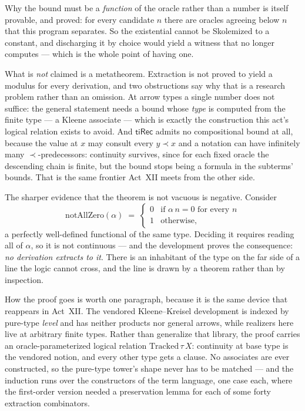 Why the bound must be a \emph{function} of the oracle rather than a number is
itself provable, and proved: for every candidate $n$ there are oracles
agreeing below $n$ that this program separates. So the existential cannot be
Skolemized to a constant, and discharging it by choice would yield a witness
that no longer computes --- which is the whole point of having one.

What is \emph{not} claimed is a metatheorem. Extraction is not proved to
yield a modulus for every derivation, and two obstructions say why that is a
research problem rather than an omission. At arrow types a single number does
not suffice: the general statement needs a bound whose \emph{type} is
computed from the finite type --- a Kleene associate --- which is exactly the
construction this act's logical relation exists to avoid. And $\mathsf{tiRec}$
admits no compositional bound at all, because the value at $x$ may consult
every $y \prec x$ and a notation can have infinitely many $\prec$-predecessors:
continuity survives, since for each fixed oracle the descending chain is
finite, but the bound stops being a formula in the subterms' bounds. That is
the same frontier Act~XII meets from the other side.

The sharper evidence that the theorem is not vacuous is negative. Consider
\[
  \mathrm{notAllZero}(\alpha) \;=\;
    \begin{cases} 0 & \text{if } \alpha\,n = 0 \text{ for every } n\\
                  1 & \text{otherwise,}\end{cases}
\]
a perfectly well-defined functional of the same type. Deciding it requires
reading all of $\alpha$, so it is not continuous --- and the development
proves the consequence: \emph{no derivation extracts to it}. There is an
inhabitant of the type on the far side of a line the logic cannot cross, and
the line is drawn by a theorem rather than by inspection.

How the proof goes is worth one paragraph, because it is the same device that
reappears in Act~XII. The vendored Kleene--Kreisel development is indexed by
pure-type \emph{level} and has neither products nor general arrows, while
realizers here live at arbitrary finite types. Rather than generalize that
library, the proof carries an oracle-parameterized logical relation
$\mathrm{Tracked}\,\tau\,X$: continuity at base type is the vendored notion,
and every other type gets a clause. No associates are ever constructed, so the
pure-type tower's shape never has to be matched --- and the induction runs
over the constructors of the term language, one case each, where the
first-order version needed a preservation lemma for each of some forty
extraction combinators.


